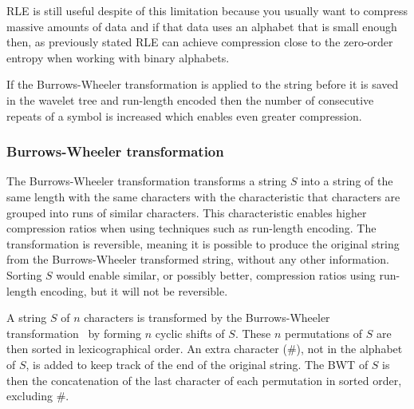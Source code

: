RLE is still useful despite of this limitation because you usually want to compress massive amounts of data and if that data uses an alphabet that is small enough then, as previously stated RLE can achieve compression close to the zero-order entropy when working with binary alphabets.

If the Burrows-Wheeler transformation is applied to the string before it is saved in the wavelet tree and run-length encoded then the number of consecutive repeats of a symbol is increased which enables even greater compression.

\subsubsection{Burrows-Wheeler transformation}
The Burrows-Wheeler transformation transforms a string $S$ into a string of the same length with the same characters with the characteristic that characters are grouped into runs of similar characters.
This characteristic enables higher compression ratios when using techniques such as run-length encoding.
The transformation is reversible, meaning it is possible to produce the original string from the Burrows-Wheeler transformed string, without any other information.
Sorting $S$ would enable similar, or possibly better, compression ratios using run-length encoding, but it will not be reversible.

A string $S$ of $n$ characters is transformed by the Burrows-Wheeler transformation~ by forming $n$ cyclic shifts of $S$. 
These $n$ permutations of $S$ are then sorted in lexicographical order.
An extra character (\#), not in the alphabet of $S$, is added to keep track of the end of the original string.
The BWT of $S$ is then the concatenation of the last character of each permutation in sorted order, excluding $\#$.

